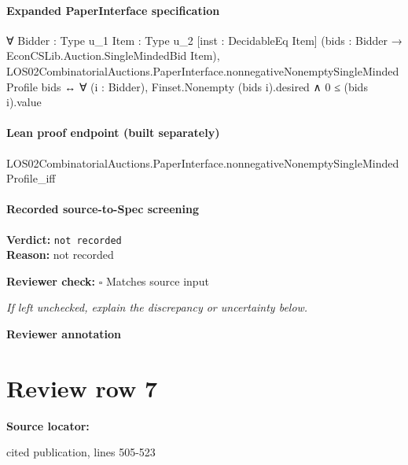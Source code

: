 \documentclass[10pt]{article}
\newcommand{\reviewerbox}{%
  \par\noindent\fbox{\parbox{0.96\linewidth}{\rule{0pt}{0.38in}}}\par
}
\newcommand{\reviewmatch}[1]{%
  \par\noindent\textbf{Reviewer check:} $\square$\; #1\par
  \noindent\emph{If left unchecked, explain the discrepancy or uncertainty below.}\par
}
\begin{document}
\paragraph{Expanded PaperInterface specification}
\begin{ReviewVerbatim}
∀ {Bidder : Type u_1} {Item : Type u_2} [inst : DecidableEq Item]
  (bids : Bidder → EconCSLib.Auction.SingleMindedBid Item),
  LOS02CombinatorialAuctions.PaperInterface.nonnegativeNonemptySingleMindedProfile bids ↔
    ∀ (i : Bidder), Finset.Nonempty (bids i).desired ∧ 0 ≤ (bids i).value
\end{ReviewVerbatim}

\paragraph{Lean proof endpoint (built separately)}\begin{ReviewVerbatim}
LOS02CombinatorialAuctions.PaperInterface.nonnegativeNonemptySingleMindedProfile_iff
\end{ReviewVerbatim}

\paragraph{Recorded source-to-Spec screening}
\textbf{Verdict:} \texttt{not recorded}
\\
\textbf{Reason:} not recorded
\reviewmatch{Matches source input}
\noindent\textbf{Reviewer annotation}\par
\reviewerbox
\clearpage
\hypertarget{source-claim-c845f64c3466b312}{}
\section*{Review row 7}
\textbf{Source locator:} {\footnotesize\raggedright cited publication, lines 505-\allowbreak{}523\par}
\end{document}
